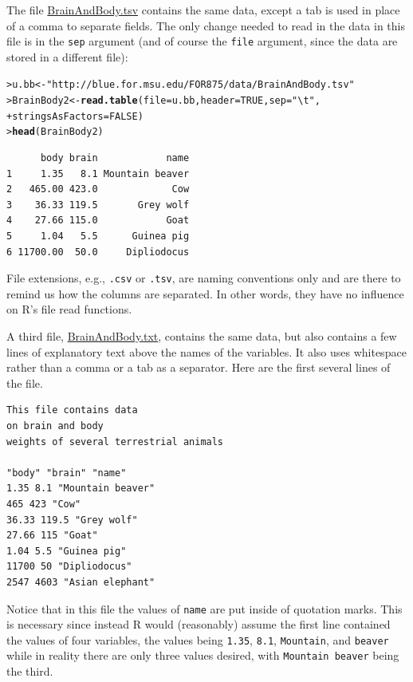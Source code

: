 \documentclass[12pt,oneside]{book}\usepackage[]{graphicx}\usepackage[]{color}
\makeatletter
\newcommand{\hlnum}[1]{\textcolor[rgb]{0.686,0.059,0.569}{#1}}%
\newcommand{\hlstr}[1]{\textcolor[rgb]{0.192,0.494,0.8}{#1}}%
\newcommand{\hlstd}[1]{\textcolor[rgb]{0.345,0.345,0.345}{#1}}%
\newcommand{\hlkwb}[1]{\textcolor[rgb]{0.69,0.353,0.396}{#1}}%
\newcommand{\hlkwc}[1]{\textcolor[rgb]{0.333,0.667,0.333}{#1}}%
\newcommand{\hlkwd}[1]{\textcolor[rgb]{0.737,0.353,0.396}{\textbf{#1}}}%
\newenvironment{kframe}{%
 \def\at@end@of@kframe{}%
 \ifinner\ifhmode%
  \def\at@end@of@kframe{\end{minipage}}%
  \begin{minipage}{\columnwidth}%
 \fi\fi%
 \def\FrameCommand##1{\hskip\@totalleftmargin \hskip-\fboxsep
 \colorbox{shadecolor}{##1}\hskip-\fboxsep
     \hskip-\linewidth \hskip-\@totalleftmargin \hskip\columnwidth}%
 \MakeFramed {\advance\hsize-\width
   \@totalleftmargin\z@ \linewidth\hsize
   \@setminipage}}%
 {\par\unskip\endMakeFramed%
 \at@end@of@kframe}
\newenvironment{knitrout}{}{} %
\makeatother
\begin{document}
The file \url{BrainAndBody.tsv} contains the same data, except a tab is used in place of a comma to separate fields. The only change needed to read in the data in this file is in the \verb+sep+ argument (and of course the \verb+file+ argument, since the data are stored in a different file):
\begin{knitrout}
\color{fgcolor}\begin{kframe}
\begin{alltt}
\hlstd{> }\hlstd{u.bb} \hlkwb{<-} \hlstr{"http://blue.for.msu.edu/FOR875/data/BrainAndBody.tsv"}
\hlstd{> }\hlstd{BrainBody2} \hlkwb{<-} \hlkwd{read.table}\hlstd{(}\hlkwc{file} \hlstd{= u.bb,} \hlkwc{header} \hlstd{=} \hlnum{TRUE}\hlstd{,} \hlkwc{sep} \hlstd{=} \hlstr{"\textbackslash{}t"}\hlstd{,}
\hlstd{+ }                         \hlkwc{stringsAsFactors} \hlstd{=} \hlnum{FALSE}\hlstd{)}
\hlstd{> }\hlkwd{head}\hlstd{(BrainBody2)}
\end{alltt}
\begin{verbatim}
      body brain            name
1     1.35   8.1 Mountain beaver
2   465.00 423.0             Cow
3    36.33 119.5       Grey wolf
4    27.66 115.0            Goat
5     1.04   5.5      Guinea pig
6 11700.00  50.0     Dipliodocus
\end{verbatim}
\end{kframe}
\end{knitrout}
File extensions, e.g., \verb+.csv+ or \verb+.tsv+, are naming conventions only and are there to remind us how the columns are separated. In other words, they have no influence on R's file read functions.

A third file, \url{BrainAndBody.txt}, contains the same data, but also contains a few lines of explanatory text above the names of the variables. It also uses whitespace rather than a comma or a tab as a separator. Here are the first several lines of the file.
\begin{verbatim}
This file contains data
on brain and body
weights of several terrestrial animals

"body" "brain" "name"
1.35 8.1 "Mountain beaver"
465 423 "Cow"
36.33 119.5 "Grey wolf"
27.66 115 "Goat"
1.04 5.5 "Guinea pig"
11700 50 "Dipliodocus"
2547 4603 "Asian elephant"
\end{verbatim}
Notice that in this file the values of \verb+name+ are put inside of quotation marks. This is necessary since instead R would (reasonably) assume the first line contained the values of four variables, the values being \verb+1.35+, \verb+8.1+, \verb+Mountain+, and \verb+beaver+ while in reality there are only three values desired, with \verb+Mountain beaver+ being the third. 
\end{document}
